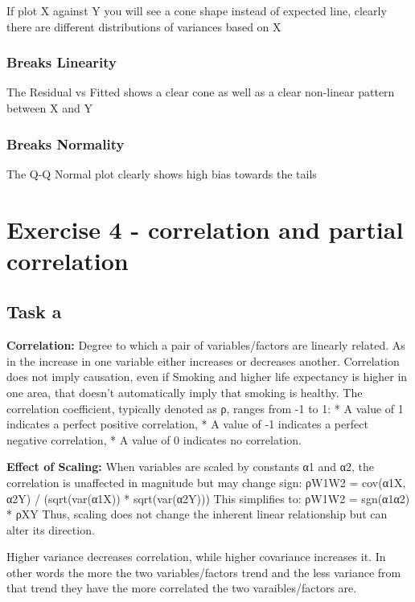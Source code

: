 \documentclass[
]{article}
\begin{document}
If plot X against Y you will see a cone shape instead of expected line,
clearly there are different distributions of variances based on X

\subsubsection{Breaks Linearity}\label{breaks-linearity}

The Residual vs Fitted shows a clear cone as well as a clear non-linear
pattern between X and Y

\subsubsection{Breaks Normality}\label{breaks-normality}

The Q-Q Normal plot clearly shows high bias towards the tails

\section{Exercise 4 - correlation and partial
correlation}\label{exercise-4---correlation-and-partial-correlation}

\subsection{Task a}\label{task-a-3}

\textbf{Correlation:} Degree to which a pair of variables/factors are
linearly related. As in the increase in one variable either increases or
decreases another. Correlation does not imply causation, even if Smoking
and higher life expectancy is higher in one area, that doesn't
automatically imply that smoking is healthy. The correlation
coefficient, typically denoted as ρ, ranges from -1 to 1: * A value of 1
indicates a perfect positive correlation, * A value of -1 indicates a
perfect negative correlation, * A value of 0 indicates no correlation.

\textbf{Effect of Scaling:} When variables are scaled by constants α1
and α2, the correlation is unaffected in magnitude but may change sign:
ρW1W2 = cov(α1X, α2Y) / (sqrt(var(α1X)) * sqrt(var(α2Y))) This
simplifies to: ρW1W2 = sgn(α1α2) * ρXY Thus, scaling does not change the
inherent linear relationship but can alter its direction.

Higher variance decreases correlation, while higher covariance increases
it. In other words the more the two variables/factors trend and the less
variance from that trend they have the more correlated the two
varaibles/factors are.
\end{document}
